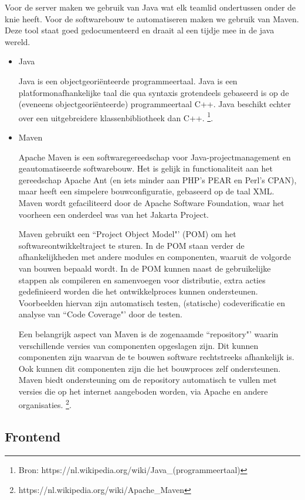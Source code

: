 \documentclass[11pt,twoside,a4paper]{article}
\begin{document}
	Voor de server maken we gebruik van Java wat elk teamlid ondertussen onder de knie heeft. Voor de softwarebouw te automatiseren maken we gebruik van Maven. Deze tool staat goed gedocumenteerd en draait al een tijdje mee in de java wereld.
	
	\begin{itemize}
	\item Java
	
Java is een objectgeori\"enteerde programmeertaal. Java is een platformonafhankelijke taal die qua syntaxis grotendeels gebaseerd is op de (eveneens objectgeori\"enteerde) programmeertaal C++. Java beschikt echter over een uitgebreidere klassenbibliotheek dan C++. \footnote{Bron: https://nl.wikipedia.org/wiki/Java\_(programmeertaal)}. 			

	
	\item Maven
	
Apache Maven is een softwaregereedschap voor Java-projectmanagement en geautomatiseerde softwarebouw. Het is gelijk in functionaliteit aan het gereedschap Apache Ant (en iets minder aan PHP's PEAR en Perl's CPAN), maar heeft een simpelere bouwconfiguratie, gebaseerd op de taal XML. Maven wordt gefaciliteerd door de Apache Software Foundation, waar het voorheen een onderdeel was van het Jakarta Project.

Maven gebruikt een ``Project Object Model"' (POM) om het softwareontwikkeltraject te sturen. In de POM staan verder de afhankelijkheden met andere modules en componenten, waaruit de volgorde van bouwen bepaald wordt. In de POM kunnen naast de gebruikelijke stappen als compileren en samenvoegen voor distributie, extra acties gedefinieerd worden die het ontwikkelproces kunnen ondersteunen. Voorbeelden hiervan zijn automatisch testen, (statische) codeverificatie en analyse van ``Code Coverage"' door de testen.

Een belangrijk aspect van Maven is de zogenaamde ``repository"' waarin verschillende versies van componenten opgeslagen zijn. Dit kunnen componenten zijn waarvan de te bouwen software rechtstreeks afhankelijk is. Ook kunnen dit componenten zijn die het bouwproces zelf ondersteunen. Maven biedt ondersteuning om de repository automatisch te vullen met versies die op het internet aangeboden worden, via Apache en andere organisaties.	\footnote{https://nl.wikipedia.org/wiki/Apache\_Maven}.
	\end{itemize}
	
	\subsection{Frontend}
	
\end{document}
